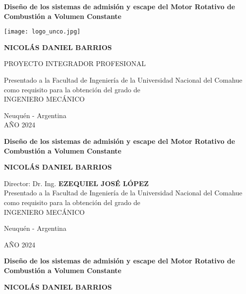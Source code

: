 \thispagestyle{empty}

\begin{center}

\Large\textbf{{Diseño de los sistemas de admisión y escape del Motor Rotativo de Combustión a Volumen Constante\\}}

\vspace{1cm}

\texttt{[image: logo\_unco.jpg]}\\

\vspace{1cm}

\Large{\textbf{
NICOLÁS DANIEL BARRIOS\\
}}
\vspace{1cm}

PROYECTO INTEGRADOR PROFESIONAL\\

\vspace{1cm}

Presentado a la Facultad de Ingeniería de la Universidad Nacional del Comahue como requisito para la obtención del grado de \\ INGENIERO MECÁNICO

\vspace{0.5cm}

Neuquén - Argentina\\
AÑO 2024

\vspace{1cm}

\pagebreak
\thispagestyle{empty}

\Large\textbf{{Diseño de los sistemas de admisión y escape del Motor Rotativo de Combustión a Volumen Constante\\}}

\vspace{4cm}

\large{\textbf{
NICOLÁS DANIEL BARRIOS\\
}}

\vspace{4cm}
Director: Dr. Ing. \textbf{EZEQUIEL JOSÉ LÓPEZ}\\


\vspace{3cm}
Presentado a la Facultad de Ingeniería de la Universidad Nacional del Comahue como requisito para la obtención del grado de \\ INGENIERO MECÁNICO

\vfill
Neuquén - Argentina

AÑO 2024

\newpage
\thispagestyle{plain}

\Large\textbf{{Diseño de los sistemas de admisión y escape del Motor Rotativo
    de Combustión a Volumen Constante \\}}

\vspace{3cm}

\large{\textbf{
NICOLÁS DANIEL BARRIOS
}}\\
\vspace{3cm}
\end{center}

